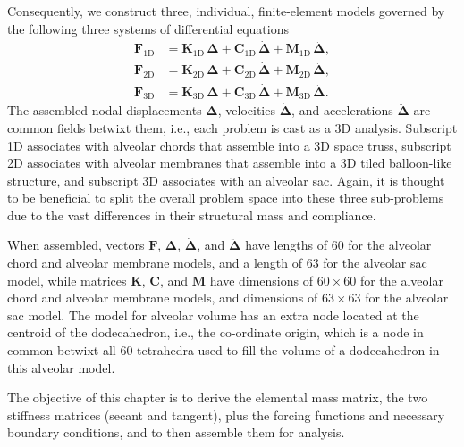 Consequently, we construct three, individual, finite-element models governed by the following three systems of differential equations
\begin{subequations}
    \label{EofMotion}
	\begin{align}
    \boldsymbol{F}_{\mathrm{1D}} & =
    \mathbf{K}_{\mathrm{1D}} \, \boldsymbol{\Delta} +
    \mathbf{C}_{\mathrm{1D}} \, \dot{\boldsymbol{\Delta}} +
    \mathbf{M}_{\mathrm{1D}} \, \ddot{\boldsymbol{\Delta}}, \\
    \boldsymbol{F}_{\mathrm{2D}} & =
    \mathbf{K}_{\mathrm{2D}} \, \boldsymbol{\Delta} +
    \mathbf{C}_{\mathrm{2D}} \, \dot{\boldsymbol{\Delta}} + 
    \mathbf{M}_{\mathrm{2D}} \, \ddot{\boldsymbol{\Delta}}, \\
    \boldsymbol{F}_{\mathrm{3D}} & = 
    \mathbf{K}_{\mathrm{3D}} \, \boldsymbol{\Delta} +
    \mathbf{C}_{\mathrm{3D}} \, \dot{\boldsymbol{\Delta}} + 
    \mathbf{M}_{\mathrm{3D}} \, \ddot{\boldsymbol{\Delta}}.
	\end{align}
\end{subequations}
The assembled nodal displacements $\boldsymbol{\Delta}$, velocities $\dot{\boldsymbol{\Delta}}$, and accelerations $\ddot{\boldsymbol{\Delta}}$ are common fields betwixt them, i.e., each problem is cast as a 3D analysis.  Subscript 1D associates with alveolar chords that assemble into a 3D space truss, subscript 2D associates with alveolar membranes that assemble into a 3D tiled balloon-like structure, and subscript 3D associates with an alveolar sac.  Again, it is thought to be beneficial to split the overall problem space into these three sub-problems due to the vast differences in their structural mass and compliance.

When assembled, vectors $\boldsymbol{F}$, $\boldsymbol{\Delta}$, $\dot{\boldsymbol{\Delta}}$, and $\ddot{\boldsymbol{\Delta}}$ have lengths of 60 for the alveolar chord and alveolar membrane models, and a length of 63 for the alveolar sac model, while matrices $\mathbf{K}$, $\mathbf{C}$, and $\mathbf{M}$ have dimensions of $60 \! \times \! 60$ for the alveolar chord and alveolar membrane models, and dimensions of $63 \! \times \! 63$ for the alveolar sac model.  The model for alveolar volume has an extra node located at the centroid of the dodecahedron, i.e., the co-ordinate origin, which is a node in common betwixt all 60 tetrahedra used to fill the volume of a dodecahedron in this alveolar model. 

The objective of this chapter is to derive the elemental mass matrix, the two stiffness matrices (secant and tangent), plus the forcing functions and necessary boundary conditions, and to then assemble them for analysis. 

